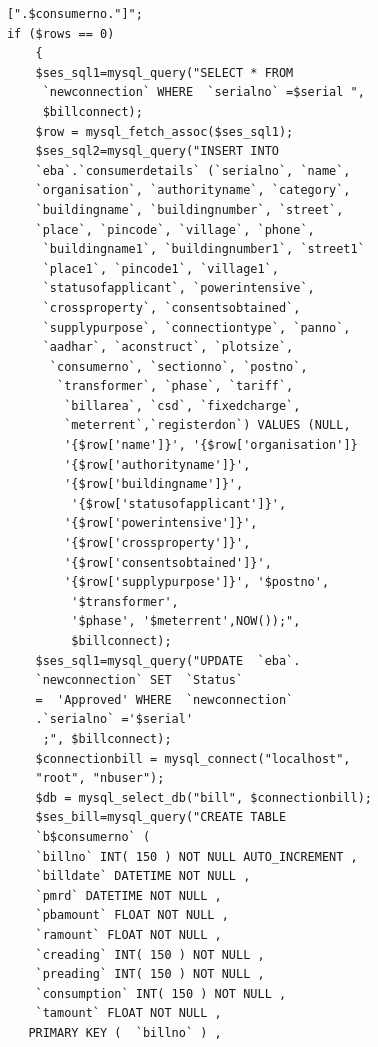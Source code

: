 \documentclass[12pt,a4paper,oneside]{report}
\begin{document}
\begin{lstlisting}
            [".$consumerno."]";
            if ($rows == 0)
                {
                $ses_sql1=mysql_query("SELECT * FROM 
                 `newconnection` WHERE  `serialno` =$serial ", 
                 $billconnect);
                $row = mysql_fetch_assoc($ses_sql1);
                $ses_sql2=mysql_query("INSERT INTO 
                `eba`.`consumerdetails` (`serialno`, `name`, 
                `organisation`, `authorityname`, `category`, 
                `buildingname`, `buildingnumber`, `street`, 
                `place`, `pincode`, `village`, `phone`,
                 `buildingname1`, `buildingnumber1`, `street1` 
                 `place1`, `pincode1`, `village1`, 
                 `statusofapplicant`, `powerintensive`, 
                 `crossproperty`, `consentsobtained`, 
                 `supplypurpose`, `connectiontype`, `panno`, 
                 `aadhar`, `aconstruct`, `plotsize`,
                  `consumerno`, `sectionno`, `postno`,
                   `transformer`, `phase`, `tariff`,
                    `billarea`, `csd`, `fixedcharge`, 
                    `meterrent`,`registerdon`) VALUES (NULL, 
                    '{$row['name']}', '{$row['organisation']} 
                    '{$row['authorityname']}', 
                    '{$row['buildingname']}', 
                     '{$row['statusofapplicant']}', 
                    '{$row['powerintensive']}', 
                    '{$row['crossproperty']}', 
                    '{$row['consentsobtained']}', 
                    '{$row['supplypurpose']}', '$postno',
                     '$transformer',
                     '$phase', '$meterrent',NOW());", 
                     $billconnect);
                $ses_sql1=mysql_query("UPDATE  `eba`.
                `newconnection` SET  `Status` 
                =  'Approved' WHERE  `newconnection`
                .`serialno` ='$serial'
                 ;", $billconnect);
                $connectionbill = mysql_connect("localhost", 
                "root", "nbuser");
                $db = mysql_select_db("bill", $connectionbill);
                $ses_bill=mysql_query("CREATE TABLE  
                `b$consumerno` (
                `billno` INT( 150 ) NOT NULL AUTO_INCREMENT ,
                `billdate` DATETIME NOT NULL ,
                `pmrd` DATETIME NOT NULL ,
                `pbamount` FLOAT NOT NULL ,
                `ramount` FLOAT NOT NULL ,
                `creading` INT( 150 ) NOT NULL ,
                `preading` INT( 150 ) NOT NULL ,
                `consumption` INT( 150 ) NOT NULL ,
                `tamount` FLOAT NOT NULL ,
               PRIMARY KEY (  `billno` ) ,

\end{lstlisting}
\end{document}
